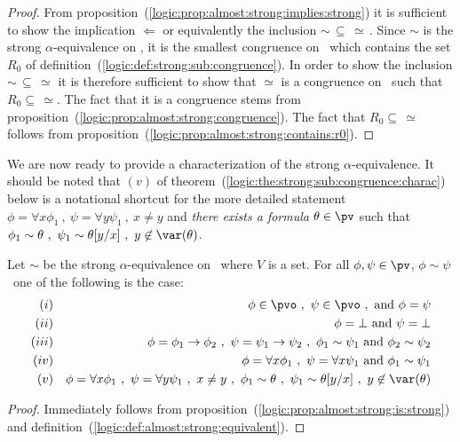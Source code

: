 \noindent
\begin{proof}
From proposition~(\ref{logic:prop:almost:strong:implies:strong}) it
is sufficient to show the implication $\Leftarrow$ or equivalently
the inclusion $\sim\,\subseteq\,\simeq\,$. Since $\sim$ is the
strong $\alpha$-equivalence on \pv, it is the smallest congruence
on \pv\ which contains the set $R_{0}$ of
definition~(\ref{logic:def:strong:sub:congruence}). In order to show
the inclusion $\sim\,\subseteq\,\simeq$ it is therefore sufficient
to show that $\simeq$ is a congruence on \pv\ such that
$R_{0}\subseteq\,\simeq$. The fact that it is a congruence stems
from proposition~(\ref{logic:prop:almost:strong:congruence}). The
fact that $R_{0}\subseteq\,\simeq$ follows from
proposition~(\ref{logic:prop:almost:strong:contains:r0}).
\end{proof}

We are now ready to provide a characterization of the strong 
$\alpha$-equivalence. It should be noted that $(v)$ of
theorem~(\ref{logic:the:strong:sub:congruence:charac}) below is a
notational shortcut for the more detailed statement $\phi=\forall
x\phi_{1}\ ,\ \psi=\forall y\psi_{1}\ ,\ x\neq y$ and {\em there
exists a formula} $\theta\in\pv$ such that $\phi_{1}\sim \theta\ ,\
\psi_{1}\sim \theta[y/x]\ ,\ y\not\in\var(\theta)$.

\begin{theorem}\label{logic:the:strong:sub:congruence:charac}
Let $\sim$ be the strong $\alpha$-equivalence on \pv\ where $V$
is a set. For all $\phi,\psi\in\pv$, $\phi\sim\psi$ \ifand\ one of
the following is the case:
    \begin{eqnarray*}
    (i)&&\phi\in\pvo\ ,\ \psi\in\pvo\ ,\ \mbox{and}\ \phi=\psi\\
    (ii)&&\phi=\bot\ \mbox{and}\ \psi=\bot\\
    (iii)&&\phi=\phi_{1}\to\phi_{2}\ ,\ \psi=\psi_{1}\to\psi_{2}\ ,\
    \phi_{1}\sim\psi_{1}\ \mbox{and}\ \phi_{2}\sim\psi_{2}\\
    (iv)&&\phi=\forall x\phi_{1}\ ,\ \psi=\forall x\psi_{1}\ \mbox{and}\ \phi_{1}\sim\psi_{1}\\
    (v)&&\phi=\forall x\phi_{1}\ ,\ \psi=\forall y\psi_{1}\ ,\ x\neq y\ ,\
    \phi_{1}\sim \theta\ ,\ \psi_{1}\sim \theta[y/x]\ ,\ y\not\in\var(\theta)
    \end{eqnarray*}
\end{theorem}

\noindent
\begin{proof}
Immediately follows from
proposition~(\ref{logic:prop:almost:strong:is:strong}) and
definition~(\ref{logic:def:almost:strong:equivalent}).
\end{proof}
